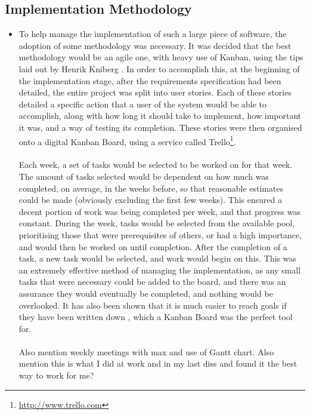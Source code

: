 \subsection{Implementation Methodology}
{\color{red}
	\begin{itemize}
		\item To help manage the implementation of such a large piece of software, the adoption of some methodology was necessary. It was decided that the best methodology would be an agile one, with heavy use of Kanban, using the tips laid out by Henrik Kniberg \cite{kniberg2007scrum}. In order to accomplish this, at the beginning of the implementation stage, after the requirements specification had been detailed, the entire project was split into user stories. Each of these stories detailed a specific action that a user of the system would be able to accomplish, along with how long it should take to implement, how important it was, and a way of testing its completion. These stories were then organised onto a digital Kanban Board, using a service called Trello\footnote{\url{http://www.trello.com}}. \ \\
		\ \\
		Each week, a set of tasks would be selected to be worked on for that week. The amount of tasks selected would be dependent on how much was completed, on average, in the weeks before, so that reasonable estimates could be made (obviously excluding the first few weeks). This ensured a decent portion of work was being completed per week, and that progress was constant. During the week, tasks would be selected from the available pool, prioritising those that were prerequisites of others, or had a high importance, and would then be worked on until completion. After the completion of a task, a new task would be selected, and work would begin on this. This was an extremely effective method of managing the implementation, as any small tasks that were necessary could be added to the board, and there was an assurance they would eventually be completed, and nothing would be overlooked. It has also been shown that it is much easier to reach goals if they have been written down \cite{wilson2008goal}, which a Kanban Board was the perfect tool for.\ \\
		\ \\
		Also mention weekly meetings with max and use of Gantt chart. Also mention this is what I did at work and in my last diss and found it the best way to work for me?
	\end{itemize}
}


